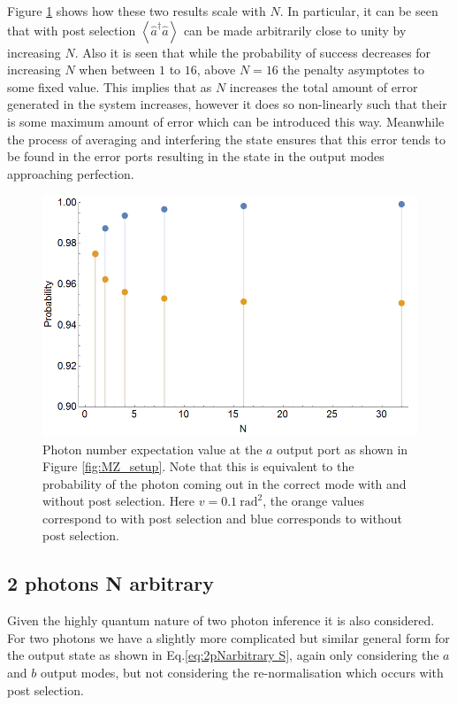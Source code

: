 \documentclass[aps,pra,twocolumn,superscriptaddress,numerical]{revtex4-1}
\begin{document}
		Figure \ref{fig:post vs no post} shows how these two results scale with $N$. In particular, it can be seen that with post selection $\left\langle \hat{a}^{\dagger}\hat{a}\right\rangle$ can be made arbitrarily close to unity by increasing $N$. Also it is seen that while the probability of success decreases for increasing $N$ when between $1$ to $16$, above $N=16$ the penalty asymptotes to some fixed value. This implies that as $N$ increases the total amount of error generated in the system increases, however it does so non-linearly such that their is some maximum amount of error which can be introduced this way. Meanwhile the process of averaging and interfering the state ensures that this error tends to be found in the error ports resulting in the state in the output modes approaching perfection.
		
		\begin{figure}
			\includegraphics[width=\columnwidth]{1photonpostvsnopost.png}
			\caption{\label{fig:post vs no post} Photon number expectation value at the $a$	output port as shown in Figure \ref{fig:MZ_setup}. Note that this is equivalent to the probability of the photon coming out in the correct mode with and without post selection. Here $v=0.1\ \textrm{rad}^{2}$, the orange values correspond to with post selection and blue corresponds to without post selection.}
		\end{figure}
	\subsection{2 photons N arbitrary \label{2 photons N arbitrary}}
	
		Given the highly quantum nature of two photon inference it is also considered. For two photons we have a slightly more complicated but similar general form for the output state as shown in Eq.\ref{eq:2pNarbitrary S}, again only considering the $a$ and $b$ output modes, but not considering the re-normalisation which occurs with post selection.
		
\end{document}
